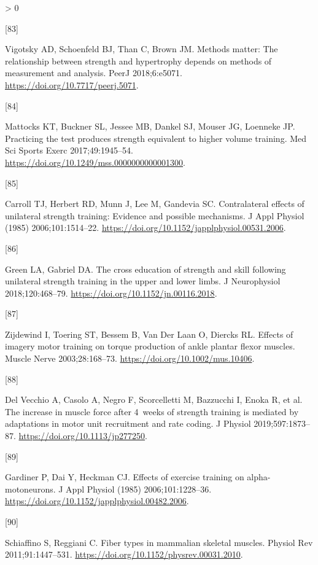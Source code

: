 \documentclass[twoside,10pt]{gihclass} %
\newlength{\cslhangindent}
\newlength{\csllabelwidth}
\newenvironment{CSLReferences}[3] %
 {%
  \setlength{\parindent}{0pt}
  \ifodd #1 \everypar{\setlength{\hangindent}{\cslhangindent}}\ignorespaces\fi
  \ifnum #2 > 0
  \setlength{\parskip}{#2\baselineskip}
  \fi
 }%
 {}
\newcommand{\CSLLeftMargin}[1]{\parbox[t]{\maxof{\widthof{#1}}{\csllabelwidth}}{#1}}
\newcommand{\CSLRightInline}[1]{\parbox[t]{\linewidth}{#1}}
\begin{document}
\begin{CSLReferences}{0}{0}
\leavevmode\hypertarget{ref-RN2158}{}%
\CSLLeftMargin{{[}83{]} }
\CSLRightInline{Vigotsky AD, Schoenfeld BJ, Than C, Brown JM. Methods matter: The relationship between strength and hypertrophy depends on methods of measurement and analysis. PeerJ 2018;6:e5071. \url{https://doi.org/10.7717/peerj.5071}.}

\leavevmode\hypertarget{ref-RN2760}{}%
\CSLLeftMargin{{[}84{]} }
\CSLRightInline{Mattocks KT, Buckner SL, Jessee MB, Dankel SJ, Mouser JG, Loenneke JP. Practicing the test produces strength equivalent to higher volume training. Med Sci Sports Exerc 2017;49:1945--54. \url{https://doi.org/10.1249/mss.0000000000001300}.}

\leavevmode\hypertarget{ref-RN2219}{}%
\CSLLeftMargin{{[}85{]} }
\CSLRightInline{Carroll TJ, Herbert RD, Munn J, Lee M, Gandevia SC. Contralateral effects of unilateral strength training: Evidence and possible mechanisms. J Appl Physiol (1985) 2006;101:1514--22. \url{https://doi.org/10.1152/japplphysiol.00531.2006}.}

\leavevmode\hypertarget{ref-RN2766}{}%
\CSLLeftMargin{{[}86{]} }
\CSLRightInline{Green LA, Gabriel DA. The cross education of strength and skill following unilateral strength training in the upper and lower limbs. J Neurophysiol 2018;120:468--79. \url{https://doi.org/10.1152/jn.00116.2018}.}

\leavevmode\hypertarget{ref-RN2767}{}%
\CSLLeftMargin{{[}87{]} }
\CSLRightInline{Zijdewind I, Toering ST, Bessem B, Van Der Laan O, Diercks RL. Effects of imagery motor training on torque production of ankle plantar flexor muscles. Muscle Nerve 2003;28:168--73. \url{https://doi.org/10.1002/mus.10406}.}

\leavevmode\hypertarget{ref-RN2763}{}%
\CSLLeftMargin{{[}88{]} }
\CSLRightInline{Del Vecchio A, Casolo A, Negro F, Scorcelletti M, Bazzucchi I, Enoka R, et al. The increase in muscle force after 4~weeks of strength training is mediated by adaptations in motor unit recruitment and rate coding. J Physiol 2019;597:1873--87. \url{https://doi.org/10.1113/jp277250}.}

\leavevmode\hypertarget{ref-RN2764}{}%
\CSLLeftMargin{{[}89{]} }
\CSLRightInline{Gardiner P, Dai Y, Heckman CJ. Effects of exercise training on alpha-motoneurons. J Appl Physiol (1985) 2006;101:1228--36. \url{https://doi.org/10.1152/japplphysiol.00482.2006}.}

\leavevmode\hypertarget{ref-RN819}{}%
\CSLLeftMargin{{[}90{]} }
\CSLRightInline{Schiaffino S, Reggiani C. Fiber types in mammalian skeletal muscles. Physiol Rev 2011;91:1447--531. \url{https://doi.org/10.1152/physrev.00031.2010}.}


\end{CSLReferences}
\end{document}
